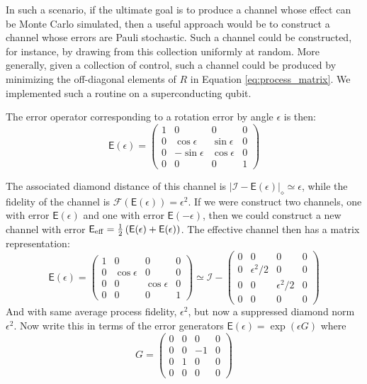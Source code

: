 \documentclass[aps,nofootinbib,pra,notitlepage,twocolumn]{revtex4-1}
\newcommand{\abs}[1]{\left\vert #1 \right\vert}
\newcommand{\error}{\ensuremath{{\mathsf{E}}}}
\begin{document}
In such a scenario, if the ultimate goal is to produce a channel whose effect can be Monte Carlo simulated, then a useful approach would be to construct a channel whose errors are Pauli stochastic. Such a channel could be constructed, for instance, by drawing from this collection uniformly at random. More generally, given a collection of control, such a channel could be produced by minimizing the off-diagonal elements of $R$ in Equation \ref{eq:process_matrix}. We implemented such a routine on a superconducting qubit.

The error operator corresponding to a rotation error by angle $\epsilon$ is then:
\begin{equation}
\error(\epsilon) =
	\left(\begin{array}{ccccc}
		1 & 0 & 0 & 0 \\ 
		0 & \cos\epsilon & \sin\epsilon  & 0  \\
		0 & -\sin\epsilon & \cos\epsilon & 0  \\
		0 & 0 & 0 & 1
	\end{array} 	
	\right)
\end{equation}

The associated diamond distance of this channel is $\abs{\mathcal{I} - \error(\epsilon)}_\diamond \simeq \epsilon$, while the fidelity of the channel is $\mathcal{F}(\error(\epsilon)) = \epsilon^2$. If we were construct two channels, one with error $\error(\epsilon)$ and one with error $\error(-\epsilon)$, then we could construct a new channel with error $\error_{\rm eff} = \frac{1}{2}\left(\error(\epsilon) + \error(\epsilon)\right)$. The effective channel then has a matrix representation:
\begin{equation}
	\error(\epsilon) =
	\left(\begin{array}{ccccc}
		1 & 0 & 0 & 0 \\ 
		0 & \cos\epsilon & 0  & 0  \\
		0 & 0 & \cos\epsilon & 0  \\
		0 & 0 & 0 & 1
	\end{array} 	
	\right) \simeq \mathcal{I} - 
	\left(\begin{array}{ccccc}
		0 & 0 & 0 & 0 \\ 
		0 & \epsilon^2/2 & 0  & 0  \\
		0 & 0 & \epsilon^2/2 & 0  \\
		0 & 0 & 0 & 0
	\end{array} 	
	\right)
\end{equation}
And with same average process fidelity, $\epsilon^2$, but now a suppressed diamond norm $\epsilon^2$. Now write this in terms of the error generators $\error(\epsilon) = \exp(\epsilon G)$ where
\begin{equation}
	G =
	\left(\begin{array}{ccccc}
		0 & 0 & 0 & 0 \\ 
		0 & 0 & -1  & 0  \\
		0 & 1 & 0 & 0  \\
		0 & 0 & 0 & 0
	\end{array} 	
	\right)
\end{equation}
\end{document}
